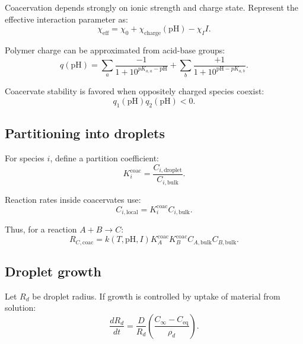 \documentclass[11pt]{article}
\begin{document}
Coacervation depends strongly on ionic strength and charge state. Represent
the effective interaction parameter as:
\begin{equation}
    \chi_{\mathrm{eff}}
    =
    \chi_0
    +
    \chi_{\mathrm{charge}}(\mathrm{pH})
    -
    \chi_I I.
\end{equation}

Polymer charge can be approximated from acid-base groups:
\begin{equation}
    q(\mathrm{pH})
    =
    \sum_a
    \frac{-1}{1+10^{pK_{a,a}-\mathrm{pH}}}
    +
    \sum_b
    \frac{+1}{1+10^{\mathrm{pH}-pK_{a,b}}}.
\end{equation}

Coacervate stability is favored when oppositely charged species coexist:
\begin{equation}
    q_1(\mathrm{pH}) q_2(\mathrm{pH}) < 0.
\end{equation}

\subsection{Partitioning into droplets}

For species $i$, define a partition coefficient:
\begin{equation}
    K_i^{\mathrm{coac}}
    =
    \frac{C_{i,\mathrm{droplet}}}{C_{i,\mathrm{bulk}}}.
\end{equation}

Reaction rates inside coacervates use:
\begin{equation}
    C_{i,\mathrm{local}} =
    K_i^{\mathrm{coac}} C_{i,\mathrm{bulk}}.
\end{equation}

Thus, for a reaction $A+B\rightarrow C$:
\begin{equation}
    R_{C,\mathrm{coac}}
    =
    k(T,\mathrm{pH},I)
    K_A^{\mathrm{coac}} K_B^{\mathrm{coac}}
    C_{A,\mathrm{bulk}} C_{B,\mathrm{bulk}}.
\end{equation}

\subsection{Droplet growth}

Let $R_d$ be droplet radius. If growth is controlled by uptake of material
from solution:
\begin{equation}
    \frac{dR_d}{dt}
    =
    \frac{D}{R_d}
    \left(
    \frac{C_{\infty}-C_{\mathrm{eq}}}{\rho_d}
    \right).
\end{equation}
\end{document}
